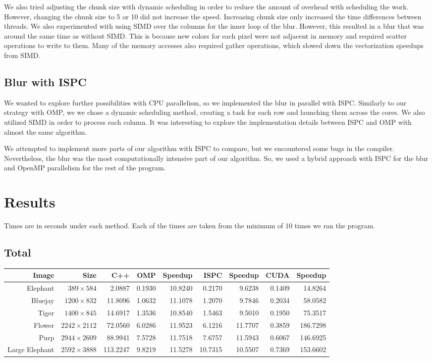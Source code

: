 \documentclass[12pt]{article}
\begin{document}
We also tried adjusting the chunk size with dynamic scheduling in order to
reduce the amount of overhead with scheduling the work. However, changing the
chunk size to 5 or 10 did not increase the speed. Increasing chunk size only
increased the time differences between threads. We also experimented with using
SIMD over the columns for the inner loop of the blur. However, this resulted in
a blur that was around the same time as without SIMD. This is because new
colors for each pixel were not adjacent in memory and required scatter
operations to write to them. Many of the memory accesses also required gather
operations, which slowed down the vectorization speedups from SIMD.

\subsection{Blur with ISPC}
We wanted to explore further possibilities with CPU parallelism, so we
implemented the blur in parallel with ISPC. Similarly to our strategy with OMP,
we we chose a dynamic scheduling method, creating a task for each row and
launching them across the cores. We also utilized SIMD in order to process each
column. It was interesting to explore the implementation details between ISPC
and OMP with almost the same algorithm.

We attempted to implement more parts of our algorithm with ISPC to compare, but
we encountered some bugs in the compiler. Nevertheless, the blur was the
most computationally intensive part of our algorithm. So, we used a hybrid
approach with ISPC for the blur and OpenMP parallelism for the rest of the
program.

\section{Results}

Times are in seconds under each method. Each of the times are taken from the
minimum of 10 times we ran the program.\\
\subsection{Total}
\begin{tabular}{r|r|r|r|r|r|r|r|r}
    Image & Size & C++ & OMP & Speedup & ISPC & Speedup & CUDA & Speedup
\\  \hline
    Elephant & $389 \times 584$ & 2.0887 & 0.1930 & 10.8240 & 0.2170 & 9.6238 & 0.1409 & 14.8264
\\  Bluejay & $1200 \times 832$ & 11.8096 & 1.0632 & 11.1078 & 1.2070 & 9.7846 & 0.2034 & 58.0582
\\  Tiger & $1400 \times 845$ & 14.6917 & 1.3536 & 10.8540 & 1.5463 & 9.5010 & 0.1950 & 75.3517
\\  Flower & $2242 \times 2112$ & 72.0560 & 6.0286 & 11.9523 & 6.1216 & 11.7707 & 0.3859 & 186.7298
\\  Purp & $2944 \times 2609$ & 88.9941 & 7.5728 & 11.7518 & 7.6757 & 11.5943 & 0.6067 & 146.6925
\\  Large Elephant & $2592 \times 3888$ & 113.2247 & 9.8219 & 11.5278 & 10.7315 & 10.5507 & 0.7369 & 153.6602
\end{tabular}
\end{document}
